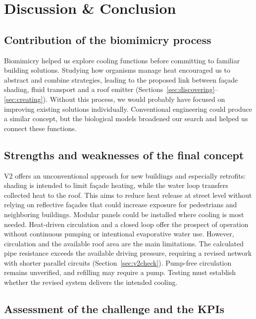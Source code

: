 \section{Discussion \& Conclusion}
\label{sec:discussion}

\subsection{Contribution of the biomimicry process}
\label{sec:contribution_process}

Biomimicry helped us explore cooling functions before committing to familiar building
solutions. Studying how organisms manage heat encouraged us to abstract and combine
strategies, leading to the proposed link between façade shading, fluid transport and a
roof emitter (Sections~\ref{sec:discovering}--\ref{sec:creating}). Without this process,
we would probably have focused on improving existing solutions individually. Conventional
engineering could produce a similar concept, but the biological models broadened our
search and helped us connect these functions.

\subsection{Strengths and weaknesses of the final concept}
\label{sec:strengths}

V2 offers an unconventional approach for new buildings and especially retrofits: shading
is intended to limit façade heating, while the water loop transfers collected heat to the
roof. This aims to reduce heat release at street level without relying on reflective
façades that could increase exposure for pedestrians and neighboring buildings. Modular
panels could be installed where cooling is most needed. Heat-driven circulation and a
closed loop offer the prospect of operation without continuous pumping or intentional
evaporative water use. However, circulation and the available roof area are the main
limitations. The calculated pipe resistance exceeds the available driving pressure,
requiring a revised network with shorter parallel circuits (Section~\ref{sec:v2check}).
Pump-free circulation remains unverified, and refilling may require a pump. Testing must
establish whether the revised system delivers the intended cooling.

\subsection{Assessment of the challenge and the KPIs}
\label{sec:assessment}

